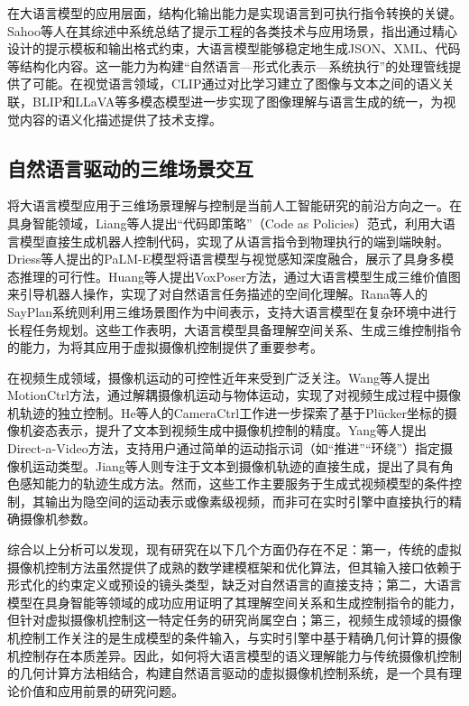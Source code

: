 在大语言模型的应用层面，结构化输出能力是实现语言到可执行指令转换的关键。Sahoo等人\cite{sahoo2024systematic}在其综述中系统总结了提示工程的各类技术与应用场景，指出通过精心设计的提示模板和输出格式约束，大语言模型能够稳定地生成JSON、XML、代码等结构化内容。这一能力为构建“自然语言—形式化表示—系统执行”的处理管线提供了可能。在视觉语言领域，CLIP\cite{radford2021learning}通过对比学习建立了图像与文本之间的语义关联，BLIP\cite{li2022blip}和LLaVA\cite{liu2023visual}等多模态模型进一步实现了图像理解与语言生成的统一，为视觉内容的语义化描述提供了技术支撑。

\subsection{自然语言驱动的三维场景交互}

将大语言模型应用于三维场景理解与控制是当前人工智能研究的前沿方向之一。在具身智能领域，Liang等人\cite{liang2023code}提出“代码即策略”（Code as Policies）范式，利用大语言模型直接生成机器人控制代码，实现了从语言指令到物理执行的端到端映射。Driess等人\cite{driess2023palme}提出的PaLM-E模型将语言模型与视觉感知深度融合，展示了具身多模态推理的可行性。Huang等人\cite{huang2023voxposer}提出VoxPoser方法，通过大语言模型生成三维价值图来引导机器人操作，实现了对自然语言任务描述的空间化理解。Rana等人\cite{rana2023sayplan}的SayPlan系统则利用三维场景图作为中间表示，支持大语言模型在复杂环境中进行长程任务规划。这些工作表明，大语言模型具备理解空间关系、生成三维控制指令的能力，为将其应用于虚拟摄像机控制提供了重要参考。

在视频生成领域，摄像机运动的可控性近年来受到广泛关注。Wang等人\cite{wang2024motionctrl}提出MotionCtrl方法，通过解耦摄像机运动与物体运动，实现了对视频生成过程中摄像机轨迹的独立控制。He等人\cite{he2024cameractrl}的CameraCtrl工作进一步探索了基于Plücker坐标的摄像机姿态表示，提升了文本到视频生成中摄像机控制的精度。Yang等人\cite{yang2024directavideo}提出Direct-a-Video方法，支持用户通过简单的运动指示词（如“推进”“环绕”）指定摄像机运动类型。Jiang等人\cite{jiang2024exceptional}则专注于文本到摄像机轨迹的直接生成，提出了具有角色感知能力的轨迹生成方法。然而，这些工作主要服务于生成式视频模型的条件控制，其输出为隐空间的运动表示或像素级视频，而非可在实时引擎中直接执行的精确摄像机参数。

综合以上分析可以发现，现有研究在以下几个方面仍存在不足：第一，传统的虚拟摄像机控制方法虽然提供了成熟的数学建模框架和优化算法，但其输入接口依赖于形式化的约束定义或预设的镜头类型，缺乏对自然语言的直接支持；第二，大语言模型在具身智能等领域的成功应用证明了其理解空间关系和生成控制指令的能力，但针对虚拟摄像机控制这一特定任务的研究尚属空白；第三，视频生成领域的摄像机控制工作关注的是生成模型的条件输入，与实时引擎中基于精确几何计算的摄像机控制存在本质差异。因此，如何将大语言模型的语义理解能力与传统摄像机控制的几何计算方法相结合，构建自然语言驱动的虚拟摄像机控制系统，是一个具有理论价值和应用前景的研究问题。

